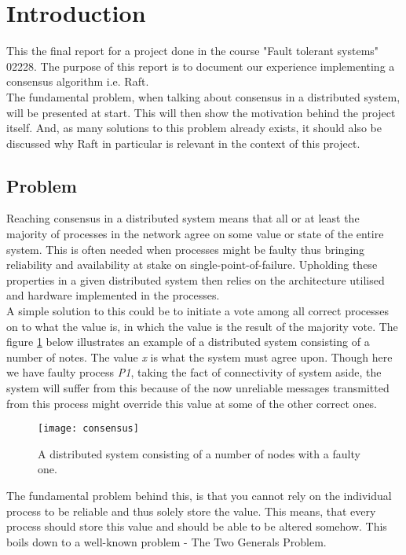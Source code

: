 \section{Introduction} %
\label{sec:introduction}

This the final report for a project done in the course "Fault tolerant systems" 02228. The purpose of this report is to document our experience implementing a consensus algorithm i.e. Raft. \\
The fundamental problem, when talking about consensus in a distributed system, will be presented at start. This will then show the motivation behind the project itself. And, as many solutions to this problem already exists, it should also be discussed why Raft in particular is relevant in the context of this project.

\subsection{Problem}
Reaching consensus in a distributed system means that all or at least the majority of processes in the network agree on some value or state of the entire system. This is often needed when processes might be faulty thus bringing reliability and availability at stake on single-point-of-failure. Upholding these properties in a given distributed system then relies on the architecture utilised and hardware implemented in the processes.\\ A simple solution to this could be to initiate a vote among all correct processes on to what the value is, in which the value is the result of the majority vote. The figure \ref{consensus} below illustrates an example of a distributed system consisting of a number of notes. The value \textit{x} is what the system must agree upon. Though here we have faulty process \textit{P1}, taking the fact of connectivity of system aside, the system will suffer from this because of the now unreliable messages transmitted from this process might override this value at some of the other correct ones. \\
\begin{figure}[h]
	\centering
	\texttt{[image: consensus]}
	\caption{A distributed system consisting of a number of nodes with a faulty one.}
	\label{consensus}
\end{figure}
The fundamental problem behind this, is that you cannot rely on the individual process to be reliable and thus solely store the value. This means, that every process should store this value and should be able to be altered somehow. This boils down to a well-known problem - The Two Generals Problem.
